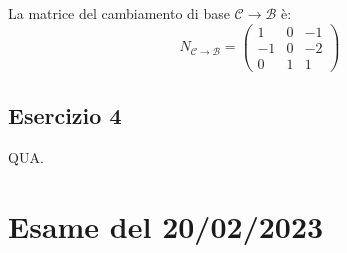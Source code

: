 \documentclass[a4paper]{article}
\begin{document}
	La matrice del cambiamento di base $\mathcal{C} \rightarrow \mathcal{B}$ è:
	\begin{equation*}
		N_{\mathcal{C} \rightarrow \mathcal{B}} = \begin{pmatrix}
			1	& 0	& -1 \\
			-1	& 0	& -2 \\
			0	& 1	& 1
		\end{pmatrix}
	\end{equation*}\newpage

	\subsection{Esercizio 4}

	QUA.

	\newpage
	\section{Esame del 20/02/2023}
\end{document}
